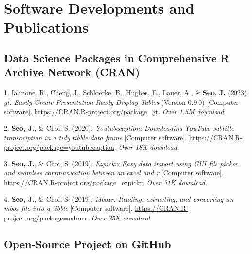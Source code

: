 \documentclass[11pt,a4paper,]{awesome-cv}
\newlength{\cslhangindent}
\newenvironment{CSLReferences}[2] %
 {\begin{list}{}{%
  \setlength{\itemindent}{0pt}
  \setlength{\leftmargin}{0pt}
  \setlength{\parsep}{0pt}
  \ifodd #1
   \setlength{\leftmargin}{\cslhangindent}
   \setlength{\itemindent}{-1\cslhangindent}
  \fi
  \setlength{\itemsep}{#2\baselineskip}}}
 {\end{list}}
\begin{document}
\section{Software Developments and
Publications}\label{software-developments-and-publications}

\subsection{Data Science Packages in Comprehensive R Archive Network
(CRAN)}\label{data-science-packages-in-comprehensive-r-archive-network-cran}

\label{refs-e4f6fe834f2d1b4cdb55cfea3d65ab90}
\begin{CSLReferences}{1}{0}
1. Iannone, R., Cheng, J., Schloerke, B., Hughes, E., Lauer, A., \&
\textbf{Seo, J.} (2023). \emph{gt: Easily Create Presentation-Ready
Display Tables} (Version 0.9.0) {[}Computer software{]}.
\url{https://CRAN.R-project.org/package=gt}. \emph{Over 1.5M download}.

2. \textbf{Seo, J.}, \& Choi, S. (2020). \emph{Youtubecaption:
Downloading YouTube subtitle transcription in a tidy tibble data frame}
{[}Computer software{]}.
\url{https://CRAN.R-project.org/package=youtubecaption}. \emph{Over 18K
download}.

3. \textbf{Seo, J.}, \& Choi, S. (2019). \emph{Ezpickr: Easy data import
using GUI file picker and seamless communication between an excel and r}
{[}Computer software{]}.
\url{https://CRAN.R-project.org/package=ezpickr}. \emph{Over 31K
download}.

4. \textbf{Seo, J.}, \& Choi, S. (2019). \emph{Mboxr: Reading,
extracting, and converting an mbox file into a tibble} {[}Computer
software{]}. \url{https://CRAN.R-project.org/package=mboxr}. \emph{Over
25K download}.

\end{CSLReferences}

\newpage

\subsection{Open-Source Project on
GitHub}\label{open-source-project-on-github}
\end{document}
